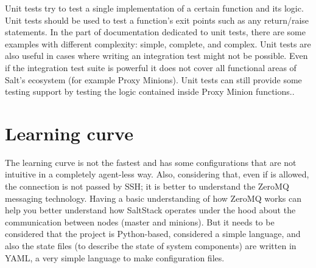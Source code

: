 \documentclass[12pt,a4paper,openright,twoside]{book}
\begin{document}
Unit tests try to test a single implementation of a certain function and its logic. Unit tests should be used to test a function's exit points such as any return/raise statements.
In the part of documentation dedicated to unit tests, there are some examples with different complexity: simple, complete, and complex.
Unit tests are also useful in cases where writing an integration test might not be possible.
Even if the integration test suite is powerful it does not cover all functional areas of Salt's ecosystem (for example Proxy Minions).
Unit tests can still provide some testing support by testing the logic contained inside Proxy Minion functions.\cite{saltDocTest}.


\section{Learning curve}
The learning curve is not the fastest and has some configurations that are not intuitive in a completely agent-less way.
Also, considering that, even if is allowed, the connection is not passed by SSH; it is better to understand the ZeroMQ messaging technology.
Having a basic understanding of how ZeroMQ works can help you better understand how SaltStack operates under the hood about the communication between nodes (master and minions).
But it needs to be considered that the project is Python-based, considered a simple language, and also the state files (to describe the state of system components) are written in YAML, a very simple language to make configuration files.



\end{document}
